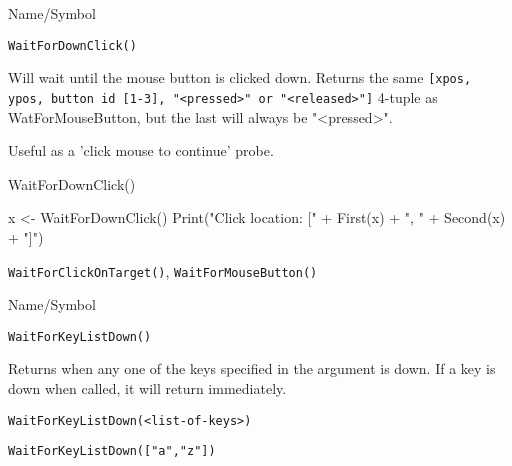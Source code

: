 \rl



\begin{desc}{Name/Symbol}
\item[Name/Symbol]  	\verb+WaitForDownClick()+

\item[Description]	Will wait until the mouse button is clicked down.  Returns
  the same   \verb+[xpos, ypos, button id [1-3], "<pressed>" or "<released>"]+
 4-tuple as WatForMouseButton, but the last will always be "<pressed>".

  Useful as a 'click mouse to continue' probe.

\item[Usage]		
   WaitForDownClick()
\item[Example]	

  x <- WaitForDownClick()
  Print("Click location: [" + First(x) + ", " + Second(x) + "]")  
\item[See Also]	
  \verb+WaitForClickOnTarget()+, \verb+WaitForMouseButton()+
\end{desc}

\rl


\begin{desc}{Name/Symbol}
\item[Name/Symbol]  	\verb+WaitForKeyListDown()+

\item[Description] Returns when any one of the keys specified in the
  argument is down. If a key is down when called, it will return immediately.

\item[Usage]
\begin{verbatim}
WaitForKeyListDown(<list-of-keys>)
\end{verbatim}

\item[Example]     	
\begin{verbatim}
WaitForKeyListDown(["a","z"])
\end{verbatim}

\item[See Also]	
 \end{desc}

\rl





